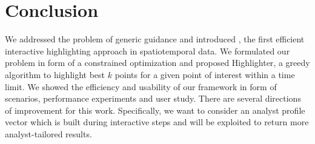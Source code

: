 \section{Conclusion}
\label{sec:conc}
We addressed the problem of generic guidance and introduced \framework, the first efficient interactive highlighting approach in spatiotemporal data. We formulated our problem in form of a constrained optimization and proposed {\sc Highlighter}, a greedy algorithm to highlight best $k$ points for a given point of interest within a time limit. We showed the efficiency and usability of our framework in form of scenarios, performance experiments and user study. There are several directions of improvement for this work. Specifically, we want to consider an analyst profile vector which is built during interactive steps and will be exploited to return more analyst-tailored results.